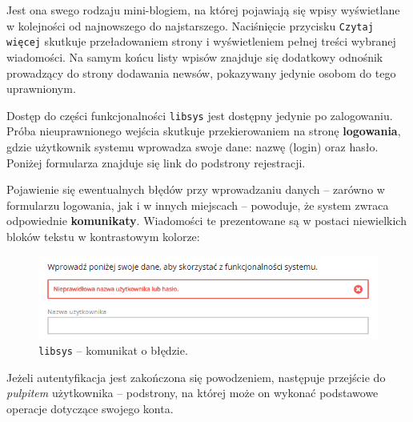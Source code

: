 \documentclass[12pt, a4paper]{article}
\begin{document}
Jest ona swego rodzaju mini-blogiem, na której pojawiają się wpisy wyświetlane w kolejności od najnowszego do najstarszego. Naciśnięcie przycisku \texttt{Czytaj więcej} skutkuje przeładowaniem strony i wyświetleniem pełnej treści wybranej wiadomości. Na samym końcu listy wpisów znajduje się dodatkowy odnośnik prowadzący do strony dodawania newsów, pokazywany jedynie osobom do tego uprawnionym.

Dostęp do części funkcjonalności \texttt{libsys} jest dostępny jedynie po zalogowaniu. Próba nieuprawnionego wejścia skutkuje przekierowaniem na stronę \textbf{logowania}, gdzie użytkownik systemu wprowadza swoje dane: nazwę (login) oraz hasło. Poniżej formularza znajduje się link do podstrony rejestracji.

Pojawienie się ewentualnych błędów przy wprowadzaniu danych -- zarówno w formularzu logowania, jak i w innych miejscach -- powoduje, że system zwraca odpowiednie \textbf{komunikaty}. Wiadomości te prezentowane są w postaci niewielkich bloków tekstu w kontrastowym kolorze:

\begin{figure}[h]
    \centering
    \includegraphics[width=\textwidth]{img/libsys_account_4.png}
    \caption{\texttt{libsys} -- komunikat o błędzie.}
\end{figure}

Jeżeli autentyfikacja jest zakończona się powodzeniem, następuje przejście do \textit{pulpitem} użytkownika -- podstrony, na której może on wykonać podstawowe operacje dotyczące swojego konta. 
\end{document}
